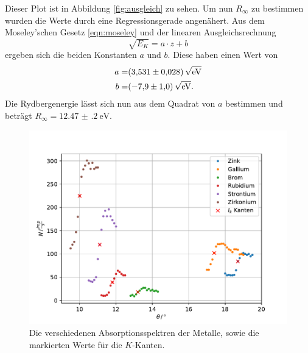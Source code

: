 Dieser Plot ist in Abbildung \ref{fig:ausgleich} zu sehen.
Um nun $R_\infty$ zu bestimmen wurden die Werte durch eine Regressionsgerade angenähert.
Aus dem Moseley'schen Gesetz \eqref{eqn:moseley} und der linearen Ausgleichsrechnung
\begin{equation*}
    \sqrt{E_K} = a \cdot z + b
\end{equation*}
ergeben sich die beiden Konstanten $a$ und $b$.
Diese haben einen Wert von 
\begin{align*}
  a =& \SI{3.531(28)}{\sqrt{\eV}}\\
  b=& \SI{-7.9(10)}{\sqrt{\eV}}.\\
\end{align*}
Die Rydbergenergie lässt sich nun aus dem Quadrat von $a$ bestimmen und beträgt $R_\infty = \SI{12.47(20)}{\eV}$.


\begin{figure}
  \centering
  \includegraphics[width=\textwidth]{content/data/verschmetalle.pdf}
  \caption{Die verschiedenen Absorptionsspektren der Metalle, sowie die markierten Werte für die $K$-Kanten.}
  \label{fig:versch}
\end{figure}

